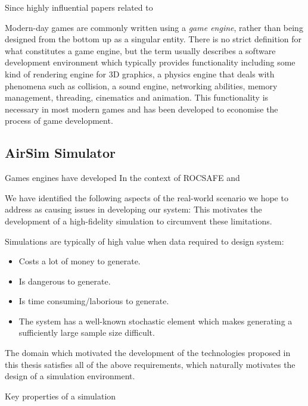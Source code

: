 Since highly influential papers related to 


Modern-day games are commonly written using a \textit{game engine}, rather than being designed from the bottom up as a singular entity. There is no strict definition for what constitutes a game engine, but the term usually describes a software development environment which typically provides functionality including some kind of rendering engine for 3D graphics, a physics engine that deals with phenomena such as collision, a sound engine, networking abilities, memory management, threading, cinematics and animation. This functionality is necessary in most modern games and has been developed to economise the process of game development.\par



\subsection{AirSim Simulator}



Games engines have developed
In the context of ROCSAFE and 



We have identified the following aspects of the real-world scenario we hope to address as causing issues in developing our system:
This motivates the development of a high-fidelity simulation to circumvent these limitations.



Simulations are typically of high value when data required to design system:
\begin{itemize}
    \item Costs a lot of money to generate.
    \item Is dangerous to generate.
    \item Is time consuming/laborious to generate.
    \item The system has a well-known stochastic element which makes generating a sufficiently large sample size difficult.
\end{itemize}
The domain which motivated the development of the technologies proposed in this thesis satisfies all of the above requirements, which naturally motivates the design of a simulation environment. \par

 Key properties of a simulation 


